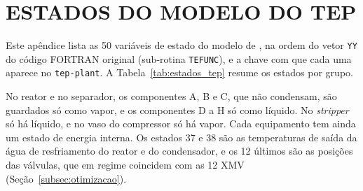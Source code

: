 \chapter[ESTADOS DO MODELO DO TEP]{ESTADOS DO MODELO DO TEP}
\label{apendice:estados}

Este apêndice lista as 50 variáveis de estado do modelo de , na ordem do vetor \texttt{YY} do código FORTRAN original (sub-rotina \texttt{TEFUNC}), e a chave com que cada uma aparece no \texttt{tep-plant}. A Tabela~\ref{tab:estados_tep} resume os estados por grupo.

No reator e no separador, os componentes A, B e C, que não condensam, são guardados só como vapor, e os componentes D a H só como líquido. No \textit{stripper} só há líquido, e no vaso do compressor só há vapor. Cada equipamento tem ainda um estado de energia interna. Os estados 37 e 38 são as temperaturas de saída da água de resfriamento do reator e do condensador, e os 12 últimos são as posições das válvulas, que em regime coincidem com as 12 XMV (Seção~\ref{subsec:otimizacao}).

